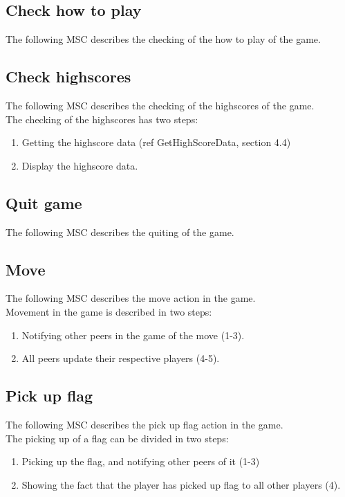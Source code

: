\documentclass[a4paper,twoside,11pt]{article}
\begin{document}
\subsection{Check how to play}
The following MSC describes the checking of the how to play of the game.\\

\subsection{Check highscores}
The following MSC describes the checking of the highscores of the game.\\
The checking of the highscores has two steps:
\begin{enumerate}
\item Getting the highscore data (ref GetHighScoreData, section 4.4)
\item Display the highscore data.
\end{enumerate}

\subsection{Quit game}
The following MSC describes the quiting of the game.\\

\subsection{Move}
The following MSC describes the move action in the game.\\
Movement in the game is described in two steps:
\begin{enumerate}
\item Notifying other peers in the game of the move (1-3).
\item All peers update their respective players (4-5).
\end{enumerate}

\subsection{Pick up flag}
The following MSC describes the pick up flag action in the game.\\
The picking up of a flag can be divided in two steps:
\begin{enumerate}
\item Picking up the flag, and notifying other peers of it (1-3)
\item Showing the fact that the player has picked up flag to all other players (4).
\end{enumerate}
\end{document}
